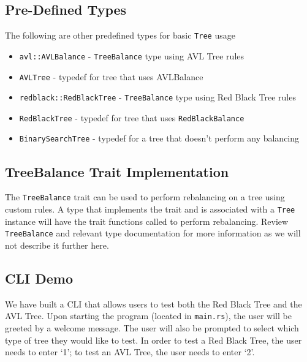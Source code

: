 \documentclass[11pt, letterpaper]{article}
\begin{document}
\subsection{Pre-Defined Types}
The following are other predefined types for basic \texttt{Tree} usage
\begin{itemize}
    \item \texttt{avl::AVLBalance} - \texttt{TreeBalance} type using AVL Tree rules
    \item \texttt{AVLTree} - typedef for tree that uses AVLBalance
    \item \texttt{redblack::RedBlackTree} - \texttt{TreeBalance} type using Red Black Tree rules
    \item \texttt{RedBlackTree} - typedef for tree that uses  \texttt{RedBlackBalance}
    \item \texttt{BinarySearchTree} - typedef for a tree that doesn't perform any balancing
\end{itemize}

\subsection{TreeBalance Trait Implementation}
The \texttt{TreeBalance} trait can be used to perform rebalancing on a tree using custom rules.
A type that implements the trait and is associated with a \texttt{Tree} instance will have the trait functions called
to perform rebalancing.  Review \texttt{TreeBalance} and relevant type documentation for more information as we will not
describe it further here.

\subsection{CLI Demo}
We have built a CLI that allows users to test both the Red Black Tree and the AVL Tree. Upon starting the program (located in \texttt{main.rs}), the user will be greeted by a welcome message. The user will also be prompted to select which type of tree they would like to test. In order to test a Red Black Tree, the user needs to enter `1'; to test an AVL Tree, the user needs to enter `2'.
\end{document}
